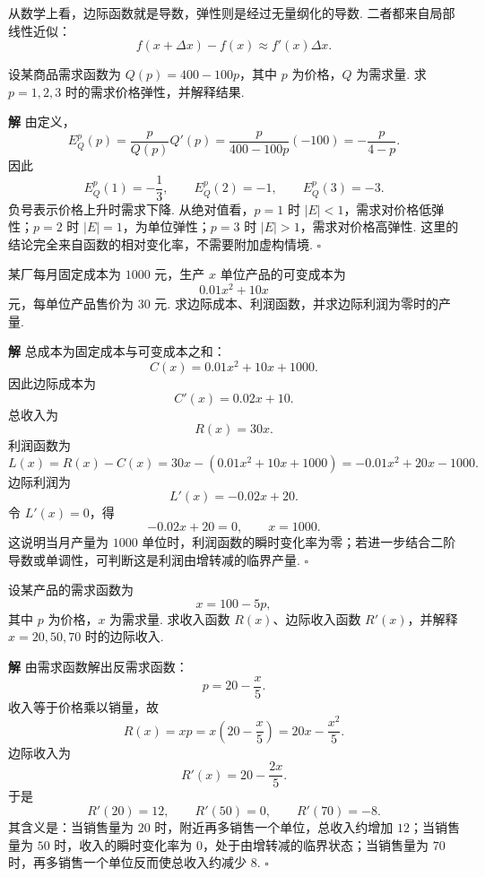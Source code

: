 \documentclass[fontset=fandol]{ctexart}
\newenvironment{solution}{\par\noindent\textbf{解}\quad}{\hfill$\square$\par\vspace{0.8em}}
\begin{document}
从数学上看，边际函数就是导数，弹性则是经过无量纲化的导数. 二者都来自局部线性近似：
\[
f(x+\Delta x)-f(x)\approx f'(x)\Delta x.
\]

\begin{example}[需求价格弹性]
设某商品需求函数为 $Q(p)=400-100p$，其中 $p$ 为价格，$Q$ 为需求量. 求 $p=1,2,3$ 时的需求价格弹性，并解释结果.
\end{example}
\begin{solution}
由定义，
\[
E_Q^p(p)=\frac{p}{Q(p)}Q'(p)=\frac{p}{400-100p}(-100)=-\frac{p}{4-p}.
\]
因此
\[
E_Q^p(1)=-\frac13,\qquad E_Q^p(2)=-1,\qquad E_Q^p(3)=-3.
\]
负号表示价格上升时需求下降. 从绝对值看，$p=1$ 时 $|E|<1$，需求对价格低弹性；$p=2$ 时 $|E|=1$，为单位弹性；$p=3$ 时 $|E|>1$，需求对价格高弹性. 这里的结论完全来自函数的相对变化率，不需要附加虚构情境.
\end{solution}

\begin{example}
某厂每月固定成本为 $1000$ 元，生产 $x$ 单位产品的可变成本为
\[
0.01x^2+10x
\]
元，每单位产品售价为 $30$ 元. 求边际成本、利润函数，并求边际利润为零时的产量.
\end{example}
\begin{solution}
总成本为固定成本与可变成本之和：
\[
C(x)=0.01x^2+10x+1000.
\]
因此边际成本为
\[
C'(x)=0.02x+10.
\]
总收入为
\[
R(x)=30x.
\]
利润函数为
\[
L(x)=R(x)-C(x)=30x-(0.01x^2+10x+1000)
=-0.01x^2+20x-1000.
\]
边际利润为
\[
L'(x)=-0.02x+20.
\]
令 $L'(x)=0$，得
\[
-0.02x+20=0,\qquad x=1000.
\]
这说明当月产量为 $1000$ 单位时，利润函数的瞬时变化率为零；若进一步结合二阶导数或单调性，可判断这是利润由增转减的临界产量.
\end{solution}

\begin{example}[需求函数与边际收入]
设某产品的需求函数为
\[
x=100-5p,
\]
其中 $p$ 为价格，$x$ 为需求量. 求收入函数 $R(x)$、边际收入函数 $R'(x)$，并解释 $x=20,50,70$ 时的边际收入.
\end{example}
\begin{solution}
由需求函数解出反需求函数：
\[
p=20-\frac{x}{5}.
\]
收入等于价格乘以销量，故
\[
R(x)=xp=x\left(20-\frac{x}{5}\right)=20x-\frac{x^2}{5}.
\]
边际收入为
\[
R'(x)=20-\frac{2x}{5}.
\]
于是
\[
R'(20)=12,\qquad R'(50)=0,\qquad R'(70)=-8.
\]
其含义是：当销售量为 $20$ 时，附近再多销售一个单位，总收入约增加 $12$；当销售量为 $50$ 时，收入的瞬时变化率为 $0$，处于由增转减的临界状态；当销售量为 $70$ 时，再多销售一个单位反而使总收入约减少 $8$.
\end{solution}
\end{document}
